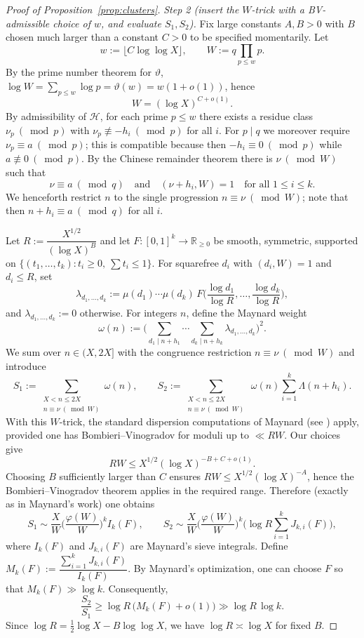 \documentclass[11pt]{amsart}
\theoremstyle{definition}
\theoremstyle{remark}
\numberwithin{equation}{section}
\begin{document}
\begin{proof}[Proof of Proposition~\ref{prop:clusters}]
\smallskip
\noindent\emph{Step 2 (insert the $W$-trick with a BV-admissible choice of $w$, and evaluate $S_1,S_2$).}
Fix large constants $A,B>0$ with $B$ chosen much larger than a constant $C>0$ to be specified momentarily. Let
\[
w:=\lfloor C\log\log X\rfloor,\qquad W:=q\prod_{p\le w} p.
\]
By the prime number theorem for $\vartheta$, $\log W=\sum_{p\le w}\log p=\vartheta(w)=w(1+o(1))$, hence
\[
W=(\log X)^{C+o(1)}.
\]
By admissibility of $\mathcal H$, for each prime $p\le w$ there exists a residue class $\nu_p\ (\bmod p)$ with $\nu_p\not\equiv -h_i\ (\bmod p)$ for all $i$. For $p\mid q$ we moreover require $\nu_p\equiv a\ (\bmod p)$; this is compatible because then $-h_i\equiv0\ (\bmod p)$ while $a\not\equiv0\ (\bmod p)$. By the Chinese remainder theorem there is $\nu\ (\bmod W)$ such that
\[
\nu\equiv a\ (\bmod q)\quad\text{and}\quad (\nu+h_i, W)=1\quad\text{for all }1\le i\le k.
\]
We henceforth restrict $n$ to the single progression $n\equiv\nu\ (\bmod W)$; note that then $n+h_i\equiv a\ (\bmod q)$ for all $i$.

Let $R:=\dfrac{X^{1/2}}{(\log X)^B}$ and let $F:[0,1]^k\to\mathbb R_{\ge0}$ be smooth, symmetric, supported on $\{(t_1,\dots,t_k): t_i\ge0,\ \sum t_i\le1\}$. For squarefree $d_i$ with $(d_i,W)=1$ and $d_i\le R$, set
\[
\lambda_{d_1,\dots,d_k}:=\mu(d_1)\cdots\mu(d_k)\,F\Big(\frac{\log d_1}{\log R},\dots,\frac{\log d_k}{\log R}\Big),
\]
and $\lambda_{d_1,\dots,d_k}:=0$ otherwise. For integers $n$, define the Maynard weight
\[
\omega(n):=\Big(\sum_{d_1\mid n+h_1}\cdots\sum_{d_k\mid n+h_k}\lambda_{d_1,\dots,d_k}\Big)^2.
\]
We sum over $n\in(X,2X]$ with the congruence restriction $n\equiv\nu\ (\bmod W)$ and introduce
\[
S_1:=\sum_{\substack{X<n\le2X\\ n\equiv\nu\ (\bmod W)}}\omega(n),\qquad
S_2:=\sum_{\substack{X<n\le2X\\ n\equiv\nu\ (\bmod W)}}\ \omega(n)\sum_{i=1}^k\Lambda(n+h_i).
\]
With this $W$-trick, the standard dispersion computations of Maynard (see \cite{MaynardCompositio}) apply, provided one has Bombieri–Vinogradov for moduli up to $\ll RW$. Our choices give
\[
RW\le X^{1/2}(\log X)^{-B+C+o(1)}.
\]
Choosing $B$ sufficiently larger than $C$ ensures $RW\le X^{1/2}(\log X)^{-A}$, hence the Bombieri–Vinogradov theorem applies in the required range. Therefore (exactly as in Maynard’s work) one obtains
\[
S_1\sim \frac{X}{W}\Big(\frac{\varphi(W)}{W}\Big)^{\!k} I_k(F),\qquad
S_2\sim \frac{X}{W}\Big(\frac{\varphi(W)}{W}\Big)^{\!k}\bigg(\log R\sum_{i=1}^k J_{k,i}(F)\bigg),
\]
where $I_k(F)$ and $J_{k,i}(F)$ are Maynard’s sieve integrals. Define $M_k(F):=\dfrac{\sum_{i=1}^k J_{k,i}(F)}{I_k(F)}$. By Maynard’s optimization, one can choose $F$ so that $M_k(F)\gg \log k$. Consequently,
\[
\frac{S_2}{S_1}\ge \log R\,\big(M_k(F)+o(1)\big)\gg \log R\,\log k.
\]
Since $\log R=\tfrac12\log X-B\log\log X$, we have $\log R\asymp\log X$ for fixed $B$.


\end{proof}
\end{document}
